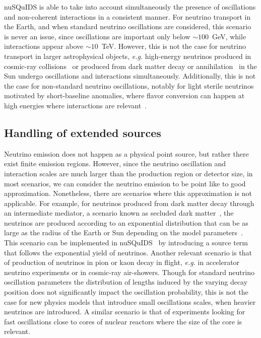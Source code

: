 \documentclass[3p,12pt]{elsarticle}
\newcommand{\ttf}{\ttfamily}
\newcounter{bla}
\begin{document}
{\ttf nuSQuIDS} is able to take into account simultaneously the presence of oscillations and non-coherent interactions in a consistent manner.
For neutrino transport in the Earth, and when standard neutrino oscillations are considered, this scenario is never an issue, since oscillations are important only below $\sim100$~GeV, while interactions appear above $\sim10$~TeV.
However, this is not the case for neutrino transport in larger astrophysical objects, \textit{e.g.} high-energy neutrinos produced in cosmic-ray collisions~\cite{Moskalenko:1991hm,Seckel:1991ffa,Ingelman:1996mj,Masip:2017gvw,Ng:2017aur,Edsjo:2017kjk,Arguelles:2017eao,IceCube:2021koo} or produced from dark matter decay or annihilation~\cite{Srednicki:1986vj,Kamionkowski:1991nj,Cirelli:2005gh,Blennow:2007tw,Barger:2007xf,Liu:2020ckq} in the Sun undergo oscillations and interactions simultaneously.
Additionally, this is not the case for non-standard neutrino oscillations, notably for light sterile neutrinos motivated by short-baseline anomalies, where flavor conversion can happen at high energies where interactions are relevant~\cite{Akhmedov:1988kd,Krastev:1989ix,Chizhov:1998ug,Chizhov:1999az,Akhmedov:1999va,Nunokawa:2003ep,Choubey:2007ji,Barger:2011rc,Esmaili:2012nz,Esmaili:2013vza,Lindner:2015iaa}.

\subsection{Handling of extended sources}

Neutrino emission does not happen as a physical point source, but rather there exist finite emission regions.
However, since the neutrino oscillation and interaction scales are much larger than the production region or detector size, in most scenarios, we can consider the neutrino emission to be point like to good approximation.
Nonetheless, there are scenarios where this approximation is not applicable.
For example, for neutrinos produced from dark matter decay through an intermediate mediator, a scenario known as secluded dark matter~\cite{Pospelov:2007mp}, the neutrinos are produced according to an exponential distribution that can be as large as the radius of the Earth or Sun depending on the model parameters~\cite{Niblaeus:2019gjk,Liu:2020ckq}.
This scenario can be implemented in nuSQuIDS~\cite{Liu:2020ckq} by introducing a source term that follows the exponential yield of neutrinos.
Another relevant scenario is that of production of neutrinos in pion or kaon decay in flight, \textit{e.g.} in accelerator neutrino experiments or in cosmic-ray air-showers.
Though for standard neutrino oscillation parameters the distribution of lengths induced by the varying decay position does not significantly impact the oscillation probability, this is not the case for new physics models that introduce small oscillations scales,  when heavier neutrinos are introduced.
A similar scenario is that of experiments looking for fast oscillations close to cores of nuclear reactors where the size of the core is relevant.
\end{document}
